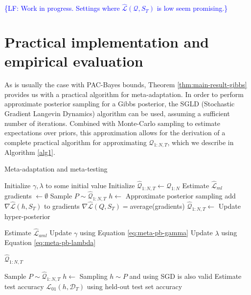 \documentclass{article}
\theoremstyle{definition}
\newcommand{\LF}[1]{\textcolor{blue}{\{LF: #1\}}}
\begin{document}
\LF{Work in progress. Settings where $\hat{\mathcal{L}}(\mathcal{Q},S_T)$ is low seem promising.}

\section{Practical implementation and empirical evaluation}

As is usually the case with PAC-Bayes bounds, Theorem \ref{thm:main-result-gibbs} provides us with a practical algorithm for meta-adaptation. In order to perform approximate posterior sampling for a Gibbs posterior, the SGLD (Stochastic Gradient Langevin Dynamics) algorithm \citep{Welling2011} can be used, assuming a sufficient number of iterations.
Combined with Monte-Carlo sampling to estimate expectations over priors, 
this approximation allows for the derivation of a complete practical algorithm for approximating $\mathcal{Q}_{1:N,T}$, which we describe in Algorithm \ref{alg1}.

\begin{algorithm}[H]
	\caption{Meta-adaptation and meta-testing}
	\label{alg1}
	\small
	\begin{algorithmic}
		\State Initialize $\gamma, \lambda$ to some initial value 
		\State Initialize $\hat{\mathcal{Q}}_{1:N, T}\leftarrow \mathcal{Q}_{1:N}$
		\State Estimate $\hat{\mathcal{L}}_{ml}$
			\State gradients $\leftarrow \emptyset$
				\State Sample $P\sim \hat{\mathcal{Q}}_{1:N, T}$
				\State $h\leftarrow$  \Comment Approximate posterior sampling
				\State add $\nabla \hat{\mathcal{L}}(h, S_T)$ to gradients
			\EndFor
			\State $\nabla \hat{\mathcal{L}}(Q, S_T)=$average(gradients)
			\State $\hat{\mathcal{Q}}_{1:N, T}\leftarrow$  \Comment Update hyper-posterior
			
			\State Estimate $\hat{\mathcal{L}}_{aml}$
			\State Update $\gamma$ using Equation \ref{eq:meta-pb-gamma}
			\State Update $\lambda$ using Equation \ref{eq:meta-pb-lambda}
			
		\EndWhile
		\State \Return $\hat{\mathcal{Q}}_{1:N, T}$
		\EndFunction
		
		\State Sample $P\sim \hat{\mathcal{Q}}_{1:N, T}$
		\State $h\leftarrow$  \Comment Sampling $h\sim P$ and using SGD is also valid
		\State Estimate test accuracy $\mathcal{L}_{01}(h, \mathcal{D}_T)$ using held-out test set
		\State \Return accuracy
		\EndFunction
	\end{algorithmic}
\end{algorithm}
\end{document}

